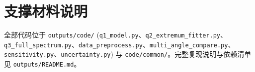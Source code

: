 \documentclass[UTF8,a4paper,12pt]{ctexart}
\begin{document}
\appendix
\section{支撑材料说明}
全部代码位于 \texttt{outputs/code/} (\texttt{q1\_model.py}、\texttt{q2\_extremum\_fitter.py}、\texttt{q3\_full\_spectrum.py}、\texttt{data\_preprocess.py}、\texttt{multi\_angle\_compare.py}、\texttt{sensitivity.py}、\texttt{uncertainty.py}) 与 \texttt{code/common/}。完整复现说明与依赖清单见 \texttt{outputs/README.md}。
\end{document}
